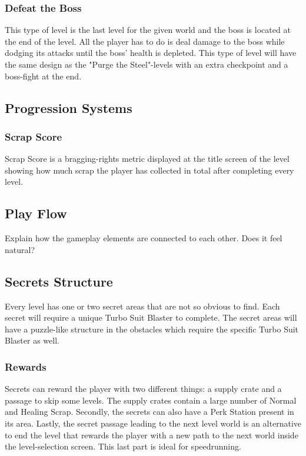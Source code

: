 \documentclass[12pt]{article}
\begin{document}
\subsubsection{Defeat the Boss}

This type of level is the last level for the given world and the boss is located at the end of the level. All the player has to do is deal damage to the boss while dodging its attacks until the boss' health is depleted. This type of level will have the same design as the "Purge the Steel"-levels with an extra checkpoint and a boss-fight at the end. 

\subsection{Progression Systems}

\subsubsection{Scrap Score}

Scrap Score is a bragging-rights metric displayed at the title screen of the level showing how much scrap the player has collected in total after completing every level. 

\subsection{Play Flow}

Explain how the gameplay elements are connected to each other. Does it feel natural?

\subsection{Secrets Structure}

Every level has one or two secret areas that are not so obvious to find. Each secret will require a unique Turbo Suit Blaster to complete. The secret areas will have a puzzle-like structure in the obstacles which require the specific Turbo Suit Blaster as well.

\subsubsection{Rewards}

Secrets can reward the player with two different things: a supply crate and a passage to skip some levels. The supply crates contain a large number of Normal and Healing Scrap. Secondly, the secrets can also have a Perk Station present in its area. Lastly, the secret passage leading to the next level world is an alternative to end the level that rewards the player with a new path to the next world inside the level-selection screen. This last part is ideal for speedrunning. 
\end{document}

